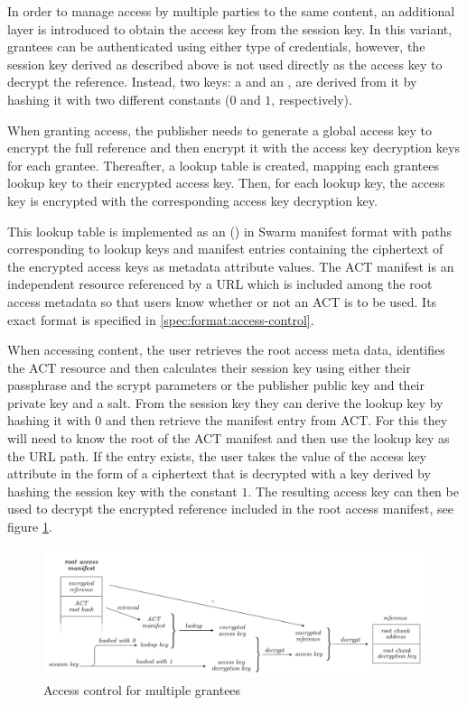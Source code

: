 In order to manage access by multiple parties to the same content, an additional layer is introduced to obtain the access key from the session key. In this variant, grantees can be authenticated using either type of credentials, however, the session key derived as
described above is not used directly as the access key to decrypt the reference. Instead, two keys: a  and an , are derived from it by hashing it with two different constants ($0$ and $1$, respectively).

When granting access, the publisher needs to generate a global access key to encrypt the full reference and then encrypt it with the
access key decryption keys for each grantee. Thereafter, a lookup table is created, mapping each grantees lookup key to their encrypted access key. Then, for each lookup key, the access key is encrypted with the corresponding access key decryption key.

This lookup table is implemented as an  () in Swarm manifest format with paths corresponding to lookup keys and manifest entries containing the ciphertext of the encrypted access keys as metadata attribute values. The ACT manifest is an independent resource referenced by a URL which is included among the root access metadata so that users know whether or not an ACT is to be used. Its exact format is specified in \ref{spec:format:access-control}.

When accessing content, the user retrieves the root access meta data, identifies the ACT resource and then calculates their session key using either their passphrase and the scrypt parameters or the publisher public key and their private key and a salt. From the session key they can derive the lookup key by hashing it with $0$ and then retrieve the manifest entry from ACT. For this they will need to know the root of the ACT manifest and then use the lookup key as the URL path. If the entry exists, the user takes the value of the access key attribute in the form of a ciphertext that is decrypted with a key derived by hashing the session key with the constant $1$. The resulting access key can then be used to decrypt the encrypted reference included in the root access manifest, see figure \ref{fig:access-control-multiple-party}.


\begin{figure}[htbp]
\centering
\includegraphics[width=\textwidth]{fig/access-control-multiple-party.pdf}
\caption[Access control for multiple grantees \statusyellow]{Access control for multiple grantees}
\label{fig:access-control-multiple-party}
\end{figure}


